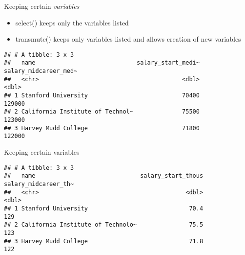 \documentclass[ignorenonframetext,]{beamer}
\newenvironment{Shaded}{\begin{snugshade}}{\end{snugshade}}
\newcommand{\KeywordTok}[1]{\textcolor[rgb]{0.13,0.29,0.53}{\textbf{#1}}}
\newcommand{\DataTypeTok}[1]{\textcolor[rgb]{0.13,0.29,0.53}{#1}}
\newcommand{\DecValTok}[1]{\textcolor[rgb]{0.00,0.00,0.81}{#1}}
\newcommand{\StringTok}[1]{\textcolor[rgb]{0.31,0.60,0.02}{#1}}
\newcommand{\OperatorTok}[1]{\textcolor[rgb]{0.81,0.36,0.00}{\textbf{#1}}}
\newcommand{\NormalTok}[1]{#1}
\providecommand{\tightlist}{%
	\setlength{\itemsep}{0pt}\setlength{\parskip}{0pt}}
\begin{document}
\begin{frame}[fragile]{Keeping certain \textit{variables}}

\begin{itemize}
\tightlist
\item
  select() keeps only the variables listed
\item
  transmute() keeps only variables listed and allows creation of new
  variables
\end{itemize}

\begin{Shaded}
\end{Shaded}

\begin{verbatim}
## # A tibble: 3 x 3
##   name                             salary_start_medi~ salary_midcareer_med~
##   <chr>                                         <dbl>                 <dbl>
## 1 Stanford University                           70400                129000
## 2 California Institute of Technol~              75500                123000
## 3 Harvey Mudd College                           71800                122000
\end{verbatim}

\end{frame}

\begin{frame}[fragile]{Keeping certain variables}

\begin{Shaded}
\end{Shaded}

\begin{verbatim}
## # A tibble: 3 x 3
##   name                              salary_start_thous salary_midcareer_th~
##   <chr>                                          <dbl>                <dbl>
## 1 Stanford University                             70.4                  129
## 2 California Institute of Technolo~               75.5                  123
## 3 Harvey Mudd College                             71.8                  122
\end{verbatim}

\end{frame}
\end{document}
